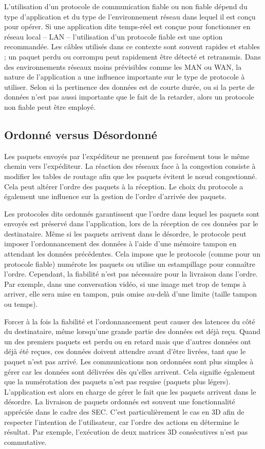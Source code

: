 L'utilisation d'un protocole de communication fiable ou non fiable dépend du 
type d'application et du type de l'environnement réseau dans lequel il est conçu 
pour opérer. Si une application dite temps-réel est conçue pour fonctionner en réseau 
local -- \gls{LAN} -- l'utilisation d'un protocole fiable est une option recommandée. 
Les câbles utilisés dans ce contexte sont souvent rapides et stables ; un paquet 
perdu ou corrompu peut rapidement être détecté et retransmis. Dans des 
environnements réseaux moins prévisibles comme les \gls{MAN} ou 
\gls{WAN}, la nature de l'application a une influence importante sur le type de 
protocole à utiliser. Selon si la pertinence des données est de courte durée, ou si 
la perte de données n'est pas aussi importante que le fait de la retarder, alors un 
protocole non fiable peut être employé.


\subsection{Ordonné versus Désordonné}
\label{sec:ordre}
Les paquets envoyés par l'expéditeur ne prennent pas forcément tous le même 
chemin vers l'expéditeur. La réaction des réseaux face à la congestion consiste à 
modifier les tables de routage afin que les paquets évitent le n\oe ud congestionné. 
Cela peut altérer l'ordre des paquets à la réception. Le choix du protocole a 
également une influence sur la gestion de l'ordre d'arrivée des paquets.

Les protocoles dits \og ordonnés\fg{} garantissent que l'ordre dans lequel les 
paquets sont envoyés est préservé dans l'application, lors de la réception de ces 
données par le destinataire. Même si les paquets arrivent dans le désordre, le 
protocole peut imposer l'ordonnancement des données à l'aide d'une mémoire 
tampon en attendant les données précédentes. Cela impose que le protocole 
(comme pour un protocole fiable) numérote les paquets ou utilise un estampillage 
pour connaître l'ordre. Cependant, la fiabilité n'est pas nécessaire pour la livraison 
dans l'ordre. Par exemple, dans une conversation vidéo, si une image met trop de 
temps à arriver, elle sera mise en tampon, puis omise au-delà d'une limite (taille 
tampon ou temps).

Forcer à la fois la fiabilité et l'ordonnancement peut causer des latences du côté 
du destinataire, même lorsqu'une grande partie des données est déjà reçu. Quand 
un des premiers paquets est perdu ou en retard mais que d'autres données ont 
déjà été reçues, ces données doivent attendre avant d'être livrées, tant que le 
paquet n'est pas arrivé. Les communications non ordonnées sont plus simples à 
gérer car les données sont délivrées dès qu'elles arrivent. Cela signifie également 
que la numérotation des paquets n'est pas requise (paquets plus légers). 
L'application est alors en charge de gérer le fait que les paquets arrivent dans le 
désordre. La livraison de paquets ordonnés est souvent une fonctionnalité 
appréciée dans le 
cadre des \gls{SEC}. C'est particulièrement le cas en 3D afin de respecter l'intention de 
l'utilisateur, car l'ordre des actions en détermine le résultat. Par 
exemple, l'exécution de deux matrices 3D consécutives n'est pas commutative.

